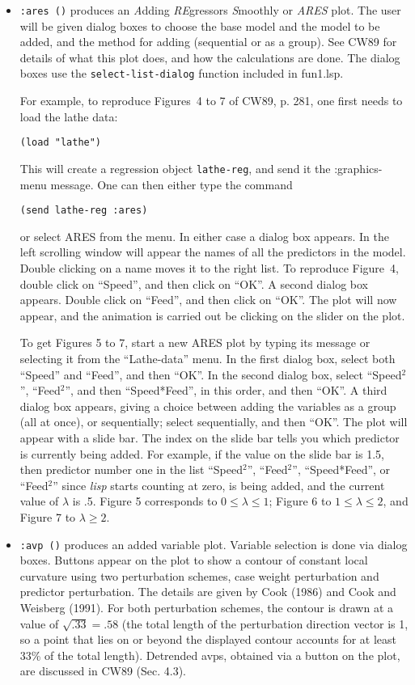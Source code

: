 \begin{itemize}
\item {\tt :ares ()}  produces an {\sl A}dding {\sl RE}gressors 
{\sl S}moothly or {\sl ARES} 
plot.  The user will be given dialog boxes to choose the base 
model and the model to be added, and the method for adding 
(sequential or as a group).  See CW89 for details of what
this plot does, and how the calculations are done.  The dialog boxes use the
{\tt select-list-dialog} function included in fun1.lsp.

For example, to reproduce Figures~4 to 7 of CW89, p. 281, one
first needs to load the lathe data:
\begin{verbatim}
(load "lathe")
\end{verbatim}
This will create a regression object {\tt lathe-reg}, and send it the
:graphics-menu message.  One can then either type the command 
\begin{verbatim}
(send lathe-reg :ares) 
\end{verbatim}
or select ARES from the menu.  In either case a dialog box
appears.  In the left scrolling window will appear the names of all the
predictors in the model.  Double clicking on a name moves it to the right
list.  To reproduce Figure~4, double click on ``Speed'', and then click on
``OK''.  A second dialog box appears.  Double click on ``Feed'', and then
click on ``OK''.  The plot will now appear, and the animation is carried out
be clicking on the slider on the plot.

To get Figures 5 to 7, start a new ARES plot by typing its message or
selecting it from the ``Lathe-data'' menu.  In the first dialog box, 
select both
``Speed'' and ``Feed'', and then ``OK''.  In the second dialog box, select
``Speed$^2$'', ``Feed$^2$'', and then ``Speed*Feed'', in this order, and then
``OK''.  A third dialog box appears, giving a choice between adding the
variables as a group (all at once), or sequentially; select sequentially, and
then ``OK''.  The plot will appear with a slide bar.  The index on the slide
bar tells you which predictor is currently being added.  For example, if the
value on the slide bar is 1.5, then predictor number one in the list
``Speed$^2$'', ``Feed$^2$'', ``Speed*Feed'', or ``Feed$^2$'' since {\sl lisp} 
starts
counting at zero, is being added, and the current value of $\lambda$ is .5.
Figure 5 corresponds to $0 \leq \lambda \leq 1$; Figure 6 to $1 \leq \lambda
\leq 2$, and Figure 7 to $\lambda \geq 2$.

\item {\tt :avp ()} produces an added variable plot.  Variable 
selection is done via dialog boxes.  Buttons appear on the plot to show
a contour of constant local curvature using two perturbation schemes, case
weight perturbation and predictor perturbation.  The details are given by Cook
(1986) and Cook and Weisberg (1991).  For both perturbation schemes, 
the contour is drawn at a
value of  $\sqrt{.33} = .58$ (the total length of the perturbation
direction vector is 1, so a point that lies on or beyond the displayed contour
accounts for at least 33\% of the total length). 
Detrended avps, obtained via a button on
the plot, are discussed in CW89 (Sec. 4.3).


\end{itemize}
